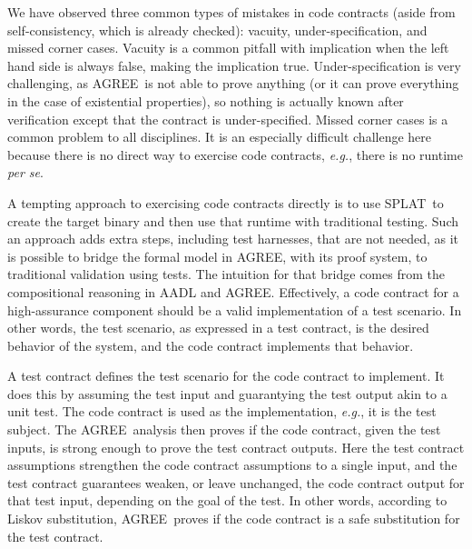 \documentclass[global,twocolumn]{svjour}
\newcommand{\agr}{AGREE}
\newcommand{\splt}{SPLAT}
\newcommand{\eg}{\textit{e.g.}}
\begin{document}
We have observed three common types of mistakes in code contracts (aside from self-consistency, which is already checked): vacuity, under-specification, and missed corner cases.
%
Vacuity is a common pitfall with implication when the left hand side is always false, making the implication true.
%
Under-specification is very challenging, as \agr\ is not able to prove anything (or it can prove everything in the case of existential properties), so nothing is actually known after verification except that the contract is under-specified.
%
Missed corner cases is a common problem to all disciplines.
%
It is an especially difficult challenge here because there is no direct way to exercise code contracts, \eg, there is no runtime \emph{per se}.

A tempting approach to exercising code contracts directly is to use \splt\ to create the target binary and then use that runtime with traditional testing.
%
Such an approach adds extra steps, including test harnesses, that are not needed, as it is possible to bridge the formal model in \agr, with its proof system, to traditional validation using tests.
%
The intuition for that bridge comes from the compositional reasoning in AADL and \agr.
%
Effectively, a code contract for a high-assurance component should be a valid implementation of a test scenario.
%
In other words, the test scenario, as expressed in a test contract, is the desired behavior of the system, and the code contract implements that behavior.

A test contract defines the test scenario for the code contract to implement.
%
It does this by assuming the test input and guarantying the test output akin to a unit test.
%
The code contract is used as the implementation, \eg, it is the test subject.
%
The \agr\ analysis then proves if the code contract, given the test inputs, is strong enough to prove the test contract outputs.
%
Here the test contract assumptions strengthen the code contract assumptions to a single input, and the test contract guarantees weaken, or leave unchanged, the code contract output for that test input, depending on the goal of the test.
%
In other words, according to Liskov substitution, \agr\ proves if the code contract is a safe substitution for the test contract.
\end{document}
